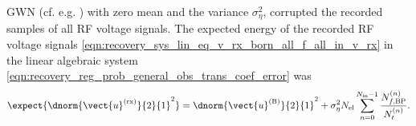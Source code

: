 \ac{GWN}
(cf. e.g. \cite[110]{book:Manolakis2005}) with
zero mean and
the variance $\sigma_{\eta}^{2}$, corrupted
the recorded samples of
all \ac{RF} voltage signals.
The expected energy of
the recorded \ac{RF} voltage signals
\eqref{eqn:recovery_sys_lin_eq_v_rx_born_all_f_all_in_v_rx} in
the linear algebraic system
\eqref{eqn:recovery_reg_prob_general_obs_trans_coef_error} was
\begin{equation*}
  \expect{
    \dnorm{ \vect{u}^{(\text{rx})} }{2}{1}^{2}
  }
  =
  \dnorm{ \vect{u}^{(\text{B})} }{2}{1}^{2}
  +
  \sigma_{\eta}^{2}
  N_{\text{el}}
  \sum_{ n = 0 }^{ N_{\text{in}} - 1 }
    \frac{
      N_{f, \text{BP}}^{(n)}
    }{
      N_{t}^{(n)}
    }.
\end{equation*}
